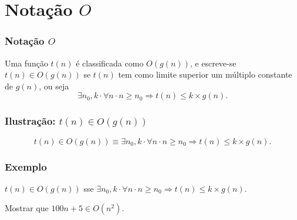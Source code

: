 \documentclass{beamer}
\begin{document}
\section{Notação \texorpdfstring{$O$}{Big Oh}}

\begin{frame}
\frametitle{Notação $O$}
\begin{definition}
Uma função $t(n)$ é classificada como $O(g(n))$, e escreve-se $t(n) \in O(g(n))$ se $t(n)$ tem como limite superior um múltiplo constante de $g(n)$, ou seja
$$
\exists n_0, k \cdot \forall n \cdot n \ge n_0 \Rightarrow t(n) \le k \times g(n).
$$
\end{definition}
\end{frame}

\begin{frame}
  \frametitle{Ilustração: $t(n) \in O(g(n))$}
  \begin{center}
    
  \end{center}
$$
t(n) \in O(g(n)) \equiv \exists n_0, k \cdot \forall n \cdot n \ge n_0 \Rightarrow t(n) \le k \times g(n).
$$
\end{frame}

\begin{frame}
\frametitle{Exemplo}

\begin{definition}
$t(n) \in O(g(n))$ sse $\exists n_0, k \cdot \forall n \cdot n \ge n_0 \Rightarrow t(n) \le k \times g(n)$.
\end{definition}

\begin{example}
Mostrar que $100n + 5 \in O(n^2)$.
\end{example}

\end{frame}
\end{document}
